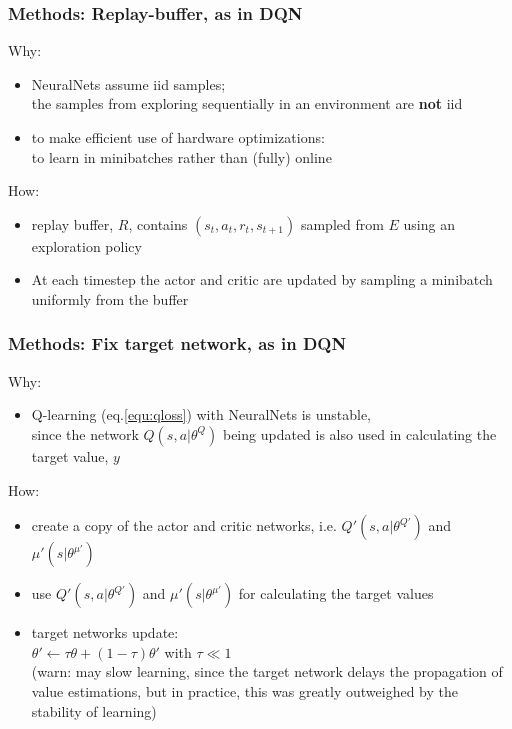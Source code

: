\begin{frame}
\frametitle{Methods: Replay-buffer, as in DQN~\cite{Mnih2013}}
Why:
\begin{itemize}
\item NeuralNets assume iid samples;\\
the samples from exploring sequentially in an environment are \textbf{not} iid
\item to make efficient use of hardware optimizations:\\
to learn in minibatches rather than (fully) online
\end{itemize}
\vspace{5mm}

How:
\begin{itemize}
  \item replay buffer, $R$, contains $(s_t, a_t, r_t, s_{t+1})$ sampled from $E$ using an exploration policy
  \item At each timestep the actor and critic are updated by sampling a minibatch uniformly from the buffer
\end{itemize}

\end{frame}

\begin{frame}
\frametitle{Methods: Fix target network, {\footnotesize as in DQN~\cite{Mnih2013}}}
Why:
\begin{itemize}
\item Q-learning (eq.\ref{equ:qloss}) with NeuralNets is unstable, \\
since the network $Q(s, a|\theta^Q)$ being updated is also used in
calculating the target value, $y$
\end{itemize}
\vspace{5mm}

How:
\begin{itemize}
\item {\footnotesize create a copy of the actor and critic networks, i.e.}
  $Q'(s, a|\theta^{Q'})$ and $\mu'(s|\theta^{\mu'})$
\item use $Q'(s, a|\theta^{Q'})$ and $\mu'(s|\theta^{\mu'})$ for calculating the target values
\item target networks update: \\
    $\theta' \leftarrow \tau \theta + (1 - \tau) \theta'$ with $\tau \ll 1$\\
    (warn: may slow learning, since the target network delays the propagation of value estimations, but
    in practice, this was greatly outweighed by the stability of learning)
\end{itemize}

\end{frame}


